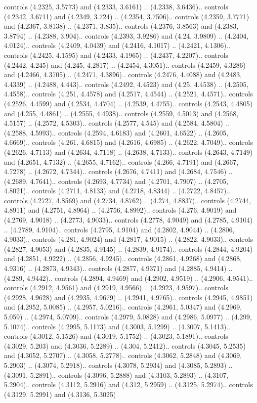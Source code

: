 controls (4.2325, 3.5773) and (4.2333, 3.6161) .. (4.2338, 3.6436).. controls (4.2342, 3.6711) and (4.2349, 3.724) .. (4.2354, 3.7506).. controls (4.2359, 3.7771) and (4.2367, 3.8138) .. (4.2371, 3.835).. controls (4.2376, 3.8563) and (4.2383, 3.8794) .. (4.2388, 3.904).. controls (4.2393, 3.9286) and (4.24, 3.9809) .. (4.2404, 4.0124).. controls (4.2409, 4.0439) and (4.2416, 4.1017) .. (4.2421, 4.1306).. controls (4.2425, 4.1595) and (4.2433, 4.1965) .. (4.2437, 4.2207).. controls (4.2442, 4.245) and (4.245, 4.2817) .. (4.2454, 4.3051).. controls (4.2459, 4.3286) and (4.2466, 4.3705) .. (4.2471, 4.3896).. controls (4.2476, 4.4088) and (4.2483, 4.4339) .. (4.2488, 4.443).. controls (4.2492, 4.4523) and (4.25, 4.4538) .. (4.2505, 4.4558).. controls (4.251, 4.4578) and (4.2517, 4.4544) .. (4.2521, 4.4571).. controls (4.2526, 4.4599) and (4.2534, 4.4704) .. (4.2539, 4.4755).. controls (4.2543, 4.4805) and (4.255, 4.4861) .. (4.2555, 4.4938).. controls (4.2559, 4.5013) and (4.2568, 4.5157) .. (4.2572, 4.5303).. controls (4.2577, 4.545) and (4.2584, 4.5804) .. (4.2588, 4.5993).. controls (4.2594, 4.6183) and (4.2601, 4.6522) .. (4.2605, 4.6669).. controls (4.261, 4.6815) and (4.2616, 4.6985) .. (4.2622, 4.7049).. controls (4.2626, 4.7113) and (4.2634, 4.7118) .. (4.2638, 4.7133).. controls (4.2643, 4.7149) and (4.2651, 4.7132) .. (4.2655, 4.7162).. controls (4.266, 4.7191) and (4.2667, 4.7278) .. (4.2672, 4.7344).. controls (4.2676, 4.7411) and (4.2684, 4.7546) .. (4.2689, 4.7641).. controls (4.2693, 4.7734) and (4.2701, 4.7907) .. (4.2705, 4.8021).. controls (4.2711, 4.8133) and (4.2718, 4.8344) .. (4.2722, 4.8457).. controls (4.2727, 4.8569) and (4.2734, 4.8762) .. (4.274, 4.8837).. controls (4.2744, 4.8911) and (4.2751, 4.8964) .. (4.2756, 4.8992).. controls (4.276, 4.9019) and (4.2769, 4.9018) .. (4.2773, 4.9033).. controls (4.2778, 4.9049) and (4.2785, 4.9104) .. (4.2789, 4.9104).. controls (4.2795, 4.9104) and (4.2802, 4.9044) .. (4.2806, 4.9033).. controls (4.281, 4.9024) and (4.2817, 4.9015) .. (4.2822, 4.9033).. controls (4.2827, 4.9053) and (4.2835, 4.9145) .. (4.2839, 4.9174).. controls (4.2844, 4.9204) and (4.2851, 4.9222) .. (4.2856, 4.9245).. controls (4.2861, 4.9268) and (4.2868, 4.9316) .. (4.2873, 4.9343).. controls (4.2877, 4.9371) and (4.2885, 4.9414) .. (4.289, 4.9442).. controls (4.2894, 4.9469) and (4.2902, 4.9519) .. (4.2906, 4.9541).. controls (4.2912, 4.9561) and (4.2919, 4.9566) .. (4.2923, 4.9597).. controls (4.2928, 4.9628) and (4.2935, 4.9679) .. (4.2941, 4.9765).. controls (4.2945, 4.9851) and (4.2952, 5.0085) .. (4.2957, 5.0216).. controls (4.2961, 5.0347) and (4.2969, 5.059) .. (4.2974, 5.0709).. controls (4.2979, 5.0828) and (4.2986, 5.0977) .. (4.299, 5.1074).. controls (4.2995, 5.1173) and (4.3003, 5.1299) .. (4.3007, 5.1413).. controls (4.3012, 5.1526) and (4.3019, 5.1752) .. (4.3023, 5.1891).. controls (4.3029, 5.203) and (4.3036, 5.2289) .. (4.304, 5.2412).. controls (4.3045, 5.2535) and (4.3052, 5.2707) .. (4.3058, 5.2778).. controls (4.3062, 5.2848) and (4.3069, 5.2903) .. (4.3074, 5.2918).. controls (4.3078, 5.2934) and (4.3085, 5.2893) .. (4.3091, 5.2891).. controls (4.3096, 5.2888) and (4.3103, 5.2893) .. (4.3107, 5.2904).. controls (4.3112, 5.2916) and (4.312, 5.2959) .. (4.3125, 5.2974).. controls (4.3129, 5.2991) and (4.3136, 5.3025) 